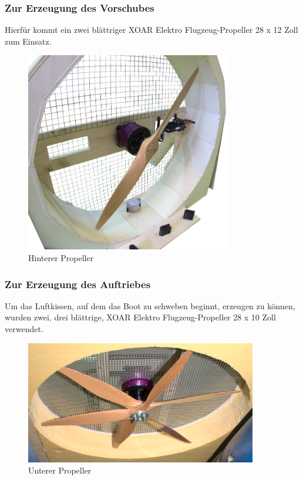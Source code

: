 \subsubsection{Zur Erzeugung des Vorschubes}
Hierfür kommt ein zwei blättriger XOAR Elektro Flugzeug-Propeller 28 x 12 Zoll zum Einsatz.

\begin{figure}[h]
    \centering
    \includegraphics[width=0.8\textwidth]{Fotos/Propeller_Hinten.png}
    \caption{Hinterer Propeller}
\end{figure}

\newpage
\subsubsection{Zur Erzeugung des Auftriebes}
Um das Luftkissen, auf dem das Boot zu schweben beginnt, erzeugen zu können, wurden zwei, drei blättrige, XOAR Elektro Flugzeug-Propeller 28 x 10 Zoll verwendet.  
\begin{figure}[h]
    \centering
    \includegraphics[width=0.9\textwidth]{Fotos/Propeller_unten.png}
    \caption{Unterer Propeller}
\end{figure}

